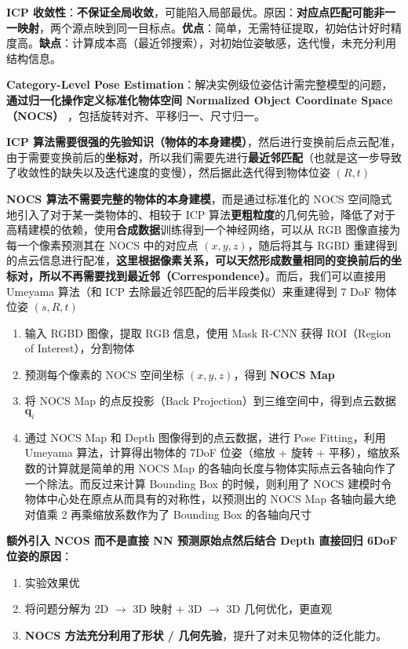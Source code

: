 \documentclass[
  8pt]{extarticle}
\providecommand{\tightlist}{%
  \setlength{\itemsep}{0pt}\setlength{\parskip}{0pt}}
\begin{document}
\begin{multicols*}{4}
\textbf{ICP
收敛性}：\textbf{不保证全局收敛}，可能陷入局部最优。原因：\textbf{对应点匹配可能非一一映射}，两个源点映到同一目标点。\textbf{优点}：简单，无需特征提取，初始估计好时精度高。\textbf{缺点}：计算成本高（最近邻搜索），对初始位姿敏感，迭代慢，未充分利用结构信息。

\textbf{Category-Level Pose
Estimation}：解决实例级位姿估计需完整模型的问题，\textbf{通过归一化操作定义标准化物体空间
Normalized Object Coordinate Space（NOCS）}
，包括旋转对齐、平移归一、尺寸归一。

\textbf{ICP
算法需要很强的先验知识（物体的本身建模）}，然后进行变换前后点云配准，由于需要变换前后的\textbf{坐标对}，所以我们需要先进行\textbf{最近邻匹配}（也就是这一步导致了收敛性的缺失以及迭代速度的变慢），然后据此迭代得到物体位姿
\((R,t)\)

\textbf{NOCS 算法不需要完整的物体的本身建模}，而是通过标准化的 NOCS
空间隐式地引入了对于某一类物体的、相较于 ICP
算法\textbf{更粗粒度}的几何先验，降低了对于高精建模的依赖，使用\textbf{合成数据}训练得到一个神经网络，可以从
RGB 图像直接为每一个像素预测其在 NOCS 中的对应点 \((x,y,z)\)，随后将其与
RGBD
重建得到的点云信息进行配准，\textbf{这里根据像素关系，可以天然形成数量相同的变换前后的坐标对，所以不再需要找到最近邻（Correspondence）}。而后，我们可以直接用
Umeyama 算法（和 ICP 去除最近邻匹配的后半段类似）来重建得到 7 DoF
物体位姿 \((s,R,t)\)

\begin{enumerate}
\def\labelenumi{\arabic{enumi}.}
\tightlist
\item
  输入 RGBD 图像，提取 RGB 信息，使用 Mask R-CNN 获得 ROI（Region of
  Interest），分割物体
\item
  预测每个像素的 NOCS 空间坐标 \((x,y,z)\)，得到 \textbf{NOCS Map}
\item
  将 NOCS Map 的点反投影（Back Projection）到三维空间中，得到点云数据
  \(\mathbf{q}_i\)
\item
  通过 NOCS Map 和 Depth 图像得到的点云数据，进行 Pose Fitting，利用
  Umeyama 算法，计算得出物体的 7DoF 位姿（缩放 + 旋转 +
  平移），缩放系数的计算就是简单的用 NOCS Map
  的各轴向长度与物体实际点云各轴向作了一个除法。而反过来计算 Bounding
  Box 的时候，则利用了 NOCS
  建模时令物体中心处在原点从而具有的对称性，以预测出的 NOCS Map
  各轴向最大绝对值乘 2 再乘缩放系数作为了 Bounding Box 的各轴向尺寸
\end{enumerate}

\textbf{额外引入 NCOS 而不是直接 NN 预测原始点然后结合 Depth 直接回归
6DoF 位姿的原因}：

\begin{enumerate}
\def\labelenumi{\arabic{enumi}.}
\tightlist
\item
  实验效果优
\item
  将问题分解为 2D \(\to\) 3D 映射 + 3D \(\to\) 3D 几何优化，更直观
\item
  \textbf{NOCS 方法充分利用了形状 /
  几何先验}，提升了对未见物体的泛化能力。
\end{enumerate}


\end{multicols*}
\end{document}
